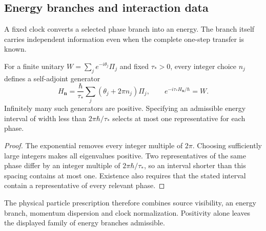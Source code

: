 \subsection{Energy branches and interaction data}
\label{sec:energy-vertices}
A fixed clock converts a selected phase branch into an energy. The branch itself carries independent information even when the complete one-step transfer is known.
\begin{proposition}\label{prop:energy-branch}
For a finite unitary $W=\sum_j e^{-i\theta_j}\Pi_j$ and fixed $\tau_*>0$, every integer choice $n_j$ defines a self-adjoint generator
\begin{equation}\label{eq:energy-branch}
H_{\boldsymbol n}=\frac{\hbar}{\tau_*}\sum_j(\theta_j+2\pi n_j)\Pi_j,
\qquad e^{-i\tau_*H_{\boldsymbol n}/\hbar}=W.
\end{equation}
Infinitely many such generators are positive. Specifying an admissible energy interval of width less than $2\pi\hbar/\tau_*$ selects at most one representative for each phase.
\end{proposition}
\begin{proof}
The exponential removes every integer multiple of $2\pi$. Choosing sufficiently large integers makes all eigenvalues positive. Two representatives of the same phase differ by an integer multiple of $2\pi\hbar/\tau_*$, so an interval shorter than this spacing contains at most one. Existence also requires that the stated interval contain a representative of every relevant phase.
\end{proof}
The physical particle prescription therefore combines source visibility, an energy branch, momentum dispersion and clock normalization. Positivity alone leaves the displayed family of energy branches admissible.

